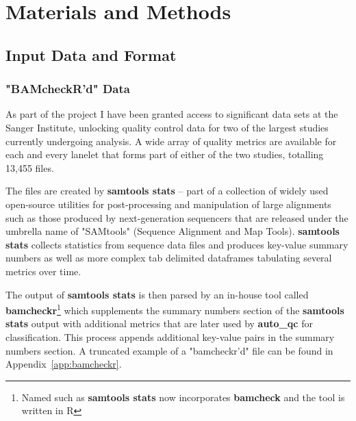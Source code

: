 \chapter{Materials and Methods}
\section{Input Data and Format}
\subsection{"BAMcheckR'd" Data}
\label{chap:bamcheckr-data}

As part of the project I have been granted access to significant data sets at the
Sanger Institute, unlocking quality control data for two of the largest studies
currently undergoing analysis. A wide array of quality metrics are available for
each and every lanelet that forms part of either of the two studies, totalling
13,455 files.


The files are created by \textbf{samtools stats} -- part of a collection of
widely used open-source utilities for post-processing and manipulation of large
alignments such as those produced by next-generation sequencers that are
released under the umbrella name of "SAMtools"\citep{samtools} (Sequence
Alignment and Map Tools). \textbf{samtools stats} collects statistics from
sequence data files and produces key-value summary numbers as well as more
complex tab delimited dataframes tabulating several metrics over time.

The output of \textbf{samtools stats} is then parsed by an in-house tool called
\textbf{bamcheckr}\footnote{Named such as \textbf{samtools stats} now incorporates
\textbf{bamcheck} and the tool is written in R} which supplements the summary
numbers section of the \textbf{samtools stats} output with additional metrics
that are later used by \textbf{auto\_qc} for classification.  This process
appends additional key-value pairs in the summary numbers section.  A truncated
example of a "bamcheckr'd" file can be found in Appendix~\ref{app:bamcheckr}.

